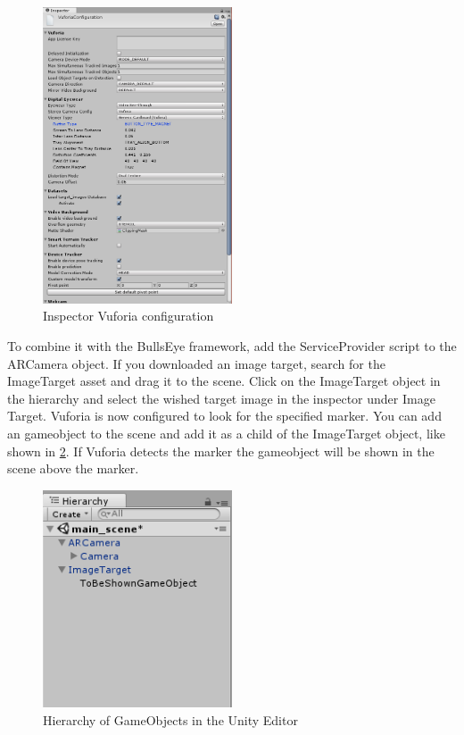 \documentclass[../../masterdoc]{subfiles}
\begin{document}
\begin{figure}[htb]
	\centering
		\includegraphics[width=0.5\textwidth]{img/inspector}
	\caption{Inspector Vuforia configuration}
	\label{fig:inspector}
\end{figure}

To combine it with the BullsEye framework, add the ServiceProvider script to the ARCamera object. 
If you downloaded an image target, search for the ImageTarget asset and drag it to the scene. Click on the ImageTarget object in the hierarchy and select the wished target image in the inspector under Image Target. Vuforia is now configured to look for the specified marker. You can add an gameobject to the scene and add it as a child of the ImageTarget object, like shown in \ref{fig:hierarchy_vuforia}. If Vuforia detects the marker the gameobject will be shown in the scene above the marker. 
\begin{figure}[htb]
	\centering
		\includegraphics[width=0.5\textwidth]{img/vuforia_hierarchy}
	\caption{Hierarchy of GameObjects in the Unity Editor}
	\label{fig:hierarchy_vuforia}
\end{figure}
\end{document}

